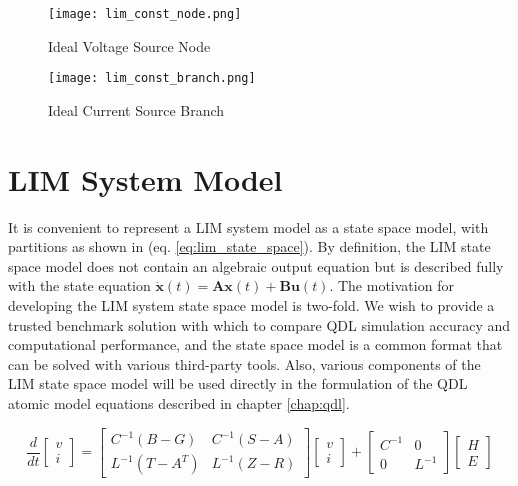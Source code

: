 \begin{figure}[ht]
    \label{fig:lim_const_node}
    \centering
    \texttt{[image: lim\_const\_node.png]}
    \caption{Ideal Voltage Source Node}
\end{figure}

\begin{figure}[ht]
    \label{fig:lim_const_branch}
    \centering
    \texttt{[image: lim\_const\_branch.png]}
    \caption{Ideal Current Source Branch}
\end{figure}

\section{LIM System Model} 

It is convenient to represent a LIM system model as a state space model, with partitions as shown in (eq. \ref{eq:lim_state_space}). By definition, the LIM state space model does not contain an algebraic output equation but is described fully with the state equation $\dot{\mathbf{x}}(t) = \mathbf{A}\mathbf{x}(t) + \mathbf{B}\mathbf{u}(t)$. The motivation for developing the LIM system state space model is two-fold. We wish to provide a trusted benchmark solution with which to compare QDL simulation accuracy and computational performance, and the state space model is a common format that can be solved with various third-party tools. Also, various components of the LIM state space model will be used directly in the formulation of the QDL atomic model equations described in chapter \ref{chap:qdl}. 

\begin{equation} \label{eq:lim_state_space}
    \frac{d}{dt}
    \begin{bmatrix}
        v \\
        i
    \end{bmatrix}
    = 
    \begin{bmatrix}
        C^{-1}(B-G)   & C^{-1}(S-A) \\
        L^{-1}(T-A^T) & L^{-1}(Z-R)
    \end{bmatrix}
    \begin{bmatrix}
        v \\
        i
    \end{bmatrix}
    +
    \begin{bmatrix}
        C^{-1}  & 0      \\
        0       & L^{-1}
    \end{bmatrix}
    \begin{bmatrix}
        H \\
        E
    \end{bmatrix}
\end{equation}


